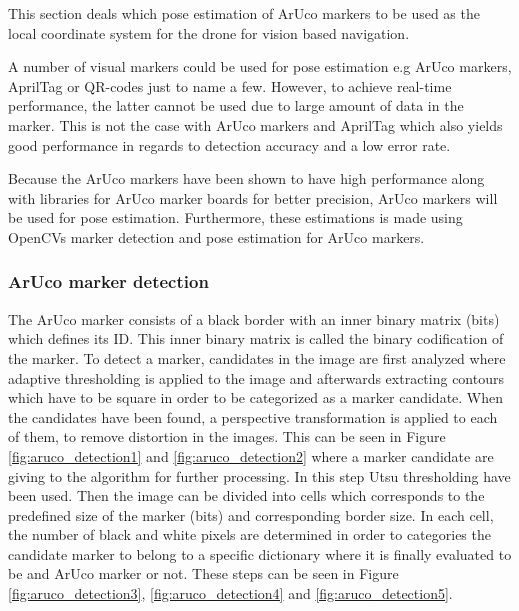 \documentclass[../Head/report.tex]{subfiles}
\begin{document}

This section deals which pose estimation of ArUco markers to be used as the local coordinate system for the drone for vision based navigation. 

A number of visual markers could be used for pose estimation e.g ArUco markers, AprilTag or QR-codes just to name a few. However, to achieve real-time performance, the latter cannot be used due to large amount of data in the marker. This is not the case with ArUco markers and AprilTag which also yields good performance in regards to detection accuracy and a low error rate. \cite{visualmarkers} 

Because the ArUco markers have been shown to have high performance along with libraries for ArUco marker boards for better precision, ArUco markers will be used for pose estimation.       Furthermore, these estimations is made using OpenCVs marker detection and pose estimation for ArUco markers.

\subsubsection{ArUco marker detection}

The ArUco marker consists of a black border with an inner binary matrix (bits) which defines its ID. This inner binary matrix is called the binary codification of the marker. To detect a marker, candidates in the image are first analyzed where adaptive thresholding is applied to the image and afterwards extracting contours which have to be square in order to be categorized as a marker candidate. When the candidates have been found, a perspective transformation is applied to each of them, to remove distortion in the images. This can be seen in Figure \ref{fig:aruco_detection1} and \ref{fig:aruco_detection2} where a marker candidate are giving to the algorithm for further processing. In this step Utsu thresholding have been used. Then the image can be divided into cells which corresponds to the predefined size of the marker (bits) and corresponding border size. In each cell, the number of black and white pixels are determined in order to categories the candidate marker to belong to a specific dictionary where it is finally evaluated to be and ArUco marker or not. These steps can be seen in Figure \ref{fig:aruco_detection3}, \ref{fig:aruco_detection4} and \ref{fig:aruco_detection5}.       
\end{document}
